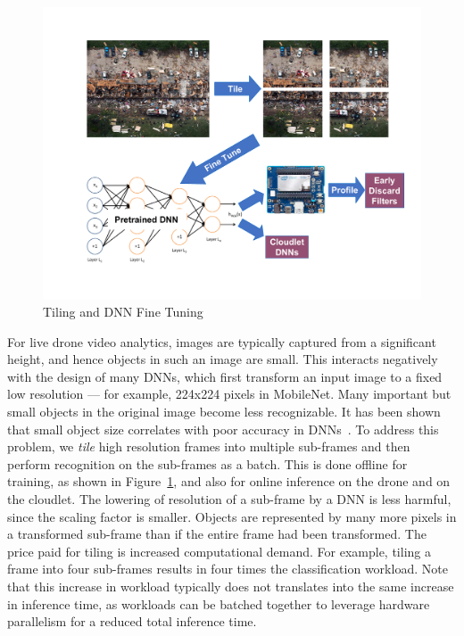 


\begin{figure}
    \centering
    \includegraphics[width=0.8\linewidth]{FIGS/fig-training.pdf}
    \caption{Tiling and DNN Fine Tuning}
    \label{fig:tiling}
\end{figure}

For live drone video analytics, images are typically captured from a significant
height, and hence objects in such an image are small.  This interacts negatively
with the design of many DNNs, which first transform an input image to a fixed
low resolution --- for example, 224x224 pixels in MobileNet. Many important but
small objects in the original image become less recognizable.  It has been shown
that small object size correlates with poor accuracy in DNNs~\cite{Huang2017}.
To address this problem, we {\em tile} high resolution frames into multiple
sub-frames and then perform recognition on the sub-frames as a batch.  This is
done offline for training, as shown in Figure~\ref{fig:tiling}, and also for
online inference on the drone and on the cloudlet.  The lowering of resolution
of a sub-frame by a DNN is less harmful, since the scaling factor is smaller.
Objects are represented by many more pixels in a transformed sub-frame than if
the entire frame had been transformed. The price paid for tiling is increased
computational demand.  For example, tiling a frame into four sub-frames results
in four times the classification workload. Note that this increase in workload
typically does not translates into the same increase in inference time, as
workloads can be batched together to leverage hardware parallelism for a reduced
total inference time.


